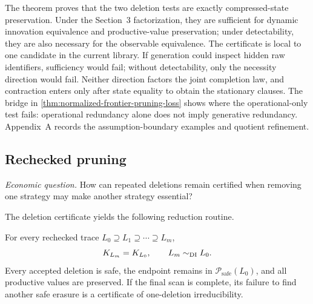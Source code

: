 The theorem proves that the two deletion tests are exactly compressed-state
preservation.  Under the Section~3 factorization, they are sufficient for
dynamic innovation equivalence and productive-value preservation; under
detectability, they are also necessary for the observable equivalence.  The
certificate is local to one candidate in the current library.  If generation
could inspect hidden raw identifiers, sufficiency would fail; without
detectability, only the necessity direction would fail.  Neither direction
factors the joint completion law, and contraction enters only after state
equality to obtain the stationary clauses.  The bridge in
\cref{thm:normalized-frontier-pruning-loss} shows where the operational-only
test fails: operational redundancy alone does not imply generative redundancy.
Appendix~A records the assumption-boundary examples and quotient refinement.

\subsection{Rechecked pruning}
\label{subsec:safe-deletion}

\emph{Economic question.}  How can repeated deletions remain certified when
removing one strategy may make another strategy essential?

The deletion certificate yields the following reduction routine.
\begin{center}
\end{center}

\begin{corollary}
\label{cor:stepwise-safe-compression}
For every rechecked trace
\(L_0\supseteq L_1\supseteq\cdots\supseteq L_m\),
\[
 K_{L_m}=K_{L_0},\qquad L_m\sim_{\mathrm{DI}}L_0.
\]
Every accepted deletion is safe, the endpoint remains in
\(\mathcal P_{\mathrm{safe}}(L_0)\), and all productive values are preserved.
If the final scan is complete, its failure to find another safe erasure is a
certificate of one-deletion irreducibility.
\end{corollary}

